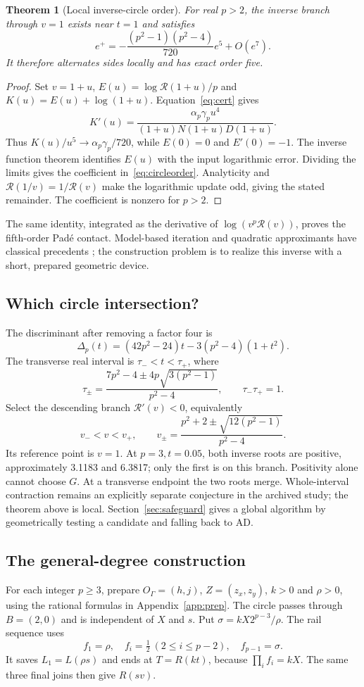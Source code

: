 \documentclass[11pt,a4paper]{article}
\newtheorem{theorem}{Theorem}[section]\newtheorem{proposition}[theorem]{Proposition}
\begin{document}
\begin{theorem}[Local inverse-circle order]
For real $p>2$, the inverse branch through $v=1$ exists near $t=1$ and satisfies
\begin{equation}\label{eq:circleorder}
 e^+=-\frac{(p^2-1)(p^2-4)}{720}e^5+O(e^7).
\end{equation}
It therefore alternates sides locally and has exact order five.
\end{theorem}
\begin{proof}
Set $v=1+u$, $E(u)=\log\mathcal R(1+u)/p$ and $K(u)=E(u)+\log(1+u)$. Equation~\eqref{eq:cert} gives
\[
 K'(u)=\frac{\alpha_p\gamma_pu^4}{(1+u)N(1+u)D(1+u)}.
\]
Thus $K(u)/u^5\to\alpha_p\gamma_p/720$, while $E(0)=0$ and $E'(0)=-1$. The inverse function theorem identifies $E(u)$ with the input logarithmic error. Dividing the limits gives the coefficient in~\eqref{eq:circleorder}. Analyticity and $\mathcal R(1/v)=1/\mathcal R(v)$ make the logarithmic update odd, giving the stated remainder. The coefficient is nonzero for $p>2$.
\end{proof}
The same identity, integrated as the derivative of $\log(v^p\mathcal R(v))$, proves the fifth-order Pad\'e contact. Model-based iteration and quadratic approximants have classical precedents \cite{traub1961,traub1964,shafer1974}; the construction problem is to realize this inverse with a short, prepared geometric device.

\subsection{Which circle intersection?}
The discriminant after removing a factor four is
\[
 \Delta_p(t)=(42p^2-24)t-3(p^2-4)(1+t^2).
\]
The transverse real interval is $\tau_-<t<\tau_+$, where
\[
 \tau_\pm=\frac{7p^2-4\pm4p\sqrt{3(p^2-1)}}{p^2-4},\qquad \tau_-\tau_+=1.
\]
Select the descending branch $\mathcal R'(v)<0$, equivalently
\[
 v_-<v<v_+,\qquad v_\pm=\frac{p^2+2\pm\sqrt{12(p^2-1)}}{p^2-4}.
\]
Its reference point is $v=1$. At $p=3,t=0.05$, both inverse roots are positive, approximately 3.1183 and 6.3817; only the first is on this branch. Positivity alone cannot choose $G$. At a transverse endpoint the two roots merge. Whole-interval contraction remains an explicitly separate conjecture in the archived study; the theorem above is local. Section~\ref{sec:safeguard} gives a global algorithm by geometrically testing a candidate and falling back to AD.
\clearpage

\subsection{The general-degree construction}\label{sec:generalcircle}
For each integer $p\ge3$, prepare $O_\Gamma=(h,j)$, $Z=(z_x,z_y)$, $k>0$ and $\rho>0$, using the rational formulas in Appendix~\ref{app:prep}. The circle passes through $B=(2,0)$ and is independent of $X$ and $s$. Put $\sigma=kX2^{p-3}/\rho$. The rail sequence uses
\[
 f_1=\rho,\quad f_i=\tfrac12\ (2\le i\le p-2),\quad f_{p-1}=\sigma.
\]
It saves $L_1=L(\rho s)$ and ends at $T=R(kt)$, because $\prod_i f_i=kX$. The same three final joins then give $R(sv)$.
\end{document}

